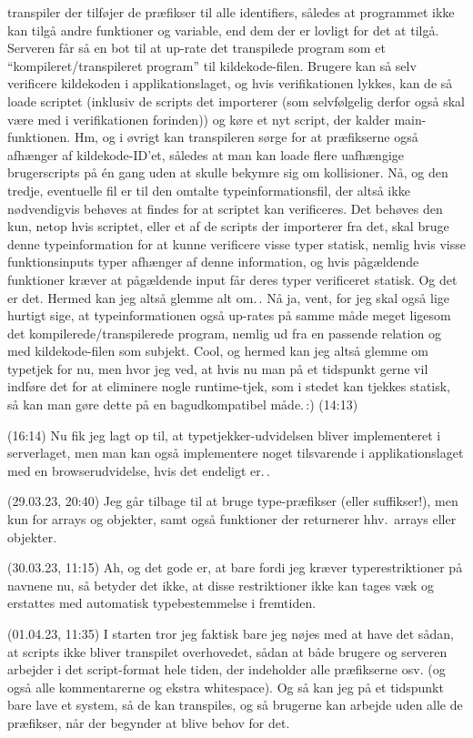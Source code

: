 \documentclass{report}
\begin{document}
transpiler der tilføjer de præfikser til alle identifiers, således at programmet ikke kan tilgå andre funktioner og variable, end dem der er lovligt for det at tilgå. Serveren får så en bot til at up-rate det transpilede program som et ``kompileret/transpileret program'' til kildekode-filen. Brugere kan så selv verificere kildekoden i applikationslaget, og hvis verifikationen lykkes, kan de så loade scriptet (inklusiv de scripts det importerer (som selvfølgelig derfor også skal være med i verifikationen forinden)) og køre et nyt script, der kalder main-funktionen. Hm, og i øvrigt kan transpileren sørge for at præfikserne også afhænger af kildekode-ID'et, således at man kan loade flere uafhængige brugerscripts på én gang uden at skulle bekymre sig om kollisioner. Nå, og den tredje, eventuelle fil er til den omtalte typeinformationsfil, der altså ikke nødvendigvis behøves at findes for at scriptet kan verificeres. Det behøves den kun, netop hvis scriptet, eller et af de scripts der importerer fra det, skal bruge denne typeinformation for at kunne verificere visse typer statisk, nemlig hvis visse funktionsinputs typer afhænger af denne information, og hvis pågældende funktioner kræver at pågældende input får deres typer verificeret statisk. Og det er det. Hermed kan jeg altså glemme alt om.\,. Nå ja, vent, for jeg skal også lige hurtigt sige, at typeinformationen også up-rates på samme måde meget ligesom det kompilerede/transpilerede program, nemlig ud fra en passende relation og med kildekode-filen som subjekt. Cool, og hermed kan jeg altså glemme om typetjek for nu, men hvor jeg ved, at hvis nu man på et tidspunkt gerne vil indføre det for at eliminere nogle runtime-tjek, som i stedet kan tjekkes statisk, så kan man gøre dette på en bagudkompatibel måde.\,:) (14:13)

(16:14) Nu fik jeg lagt op til, at typetjekker-udvidelsen bliver implementeret i serverlaget, men man kan også implementere noget tilsvarende i applikationslaget med en browserudvidelse, hvis det endeligt er.\,.

(29.03.23, 20:40) Jeg går tilbage til at bruge type-præfikser (eller suffikser!), men kun for arrays og objekter, samt også funktioner der returnerer hhv.\ arrays eller objekter.

(30.03.23, 11:15) Ah, og det gode er, at bare fordi jeg kræver typerestriktioner på navnene nu, så betyder det ikke, at disse restriktioner ikke kan tages væk og erstattes med automatisk typebestemmelse i fremtiden.

(01.04.23, 11:35) I starten tror jeg faktisk bare jeg nøjes med at have det sådan, at scripts ikke bliver transpilet overhovedet, sådan at både brugere og serveren arbejder i det script-format hele tiden, der indeholder alle præfikserne osv. (og også alle kommentarerne og ekstra whitespace). Og så kan jeg på et tidspunkt bare lave et system, så de kan transpiles, og så brugerne kan arbejde uden alle de præfikser, når der begynder at blive behov for det. 
\end{document}
